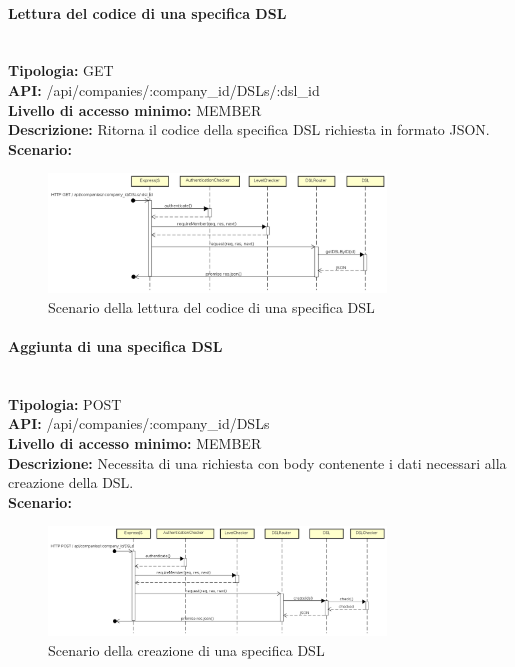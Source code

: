 \newpage
\paragraph{Lettura del codice di una specifica DSL}\mbox{}\\
\textbf{Tipologia:} GET \\
\textbf{API:} /api/companies/:company\_id/DSLs/:dsl\_id \\
\textbf{Livello di accesso minimo:} MEMBER \\
\textbf{Descrizione:} Ritorna il codice della specifica DSL richiesta in formato JSON. \\
\textbf{Scenario:} 
\begin{figure}[H]
\centering
\includegraphics[width=0.8\textwidth]{res/sections/backend/sequence/(GET)dslByID.png}
\caption{Scenario della lettura del codice di una specifica DSL}
\end{figure}

\newpage
\paragraph{Aggiunta di una specifica DSL}\mbox{}\\
\textbf{Tipologia:} POST \\
\textbf{API:} /api/companies/:company\_id/DSLs \\
\textbf{Livello di accesso minimo:} MEMBER \\
\textbf{Descrizione:} Necessita di una richiesta con body contenente i dati necessari alla creazione della DSL. \\
\textbf{Scenario:} 
\begin{figure}[H]
\centering
\includegraphics[width=0.8\textwidth]{res/sections/backend/sequence/(POST)dsl.png}
\caption{Scenario della creazione di una specifica DSL}
\end{figure}

